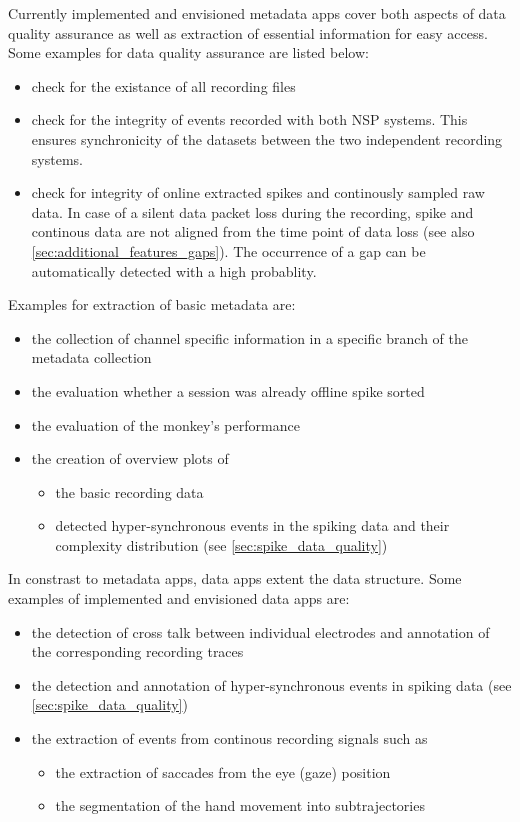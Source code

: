 Currently implemented and envisioned metadata apps cover both aspects of data quality assurance as well as extraction of essential information for easy access. Some examples for data quality assurance are listed below:
\begin{itemize}
 \item check for the existance of all recording files
 \item check for the integrity of events recorded with both NSP systems. This ensures synchronicity of the datasets between the two independent  recording systems.
 \item check for integrity of online extracted spikes and continously sampled raw data. In case of a silent data packet loss during the recording, spike and continous data are not aligned from the time point of data loss (see also \ref{sec:additional_features_gaps}). The occurrence of a gap can be automatically detected with a high probablity.
\end{itemize}

Examples for extraction of basic metadata are:
\begin{itemize}
  \setlength{\itemsep}{1pt}
  \setlength{\parskip}{0pt}
  \setlength{\parsep}{0pt}
 \item the collection of channel specific information in a specific branch of the metadata collection
 \item the evaluation whether a session was already offline spike sorted
 \item the evaluation of the monkey's performance
 \item the creation of overview plots of 
 \begin{itemize}
  \item the basic recording data
  \item detected hyper-synchronous events in the spiking data and their complexity distribution (see \cref{sec:spike_data_quality})
 \end{itemize}
\end{itemize}

In constrast to metadata apps, data apps extent the  data structure. Some examples of implemented and envisioned data apps are:
\begin{itemize}
  \setlength{\itemsep}{1pt}
  \setlength{\parskip}{0pt}
  \setlength{\parsep}{0pt}
 \item the detection of cross talk between individual electrodes and annotation of the corresponding recording traces
  \item the detection and annotation of hyper-synchronous events in spiking data (see \cref{sec:spike_data_quality})
 \item the extraction of events from continous recording signals such as
 \begin{itemize}
  \item the extraction of saccades from the eye (gaze) position
  \item the segmentation of the hand movement into subtrajectories
 \end{itemize}
\end{itemize}


